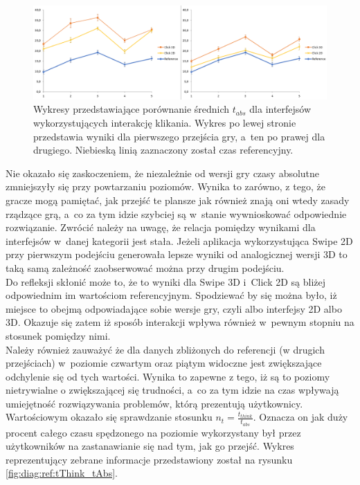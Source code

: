 \documentclass[a4paper,12pt,numbers=noenddot]{report}
\begin{document}
\begin{figure}[h!]
	\centering
  	\includegraphics[width=\linewidth]{diag/tAbs_click12.png}
	\caption{Wykresy przedstawiające porównanie średnich $t_{abs}$ dla interfejsów wykorzystujących interakcję klikania. Wykres po lewej stronie przedstawia wyniki dla pierwszego przejścia gry, a~ten po prawej dla drugiego. Niebieską linią zaznaczony został czas referencyjny.}
	\label{fig:diag:tAbs_click12}
\end{figure}

Nie okazało się zaskoczeniem, że niezależnie od wersji gry czasy absolutne zmniejszyły się przy powtarzaniu poziomów. Wynika to zarówno, z tego, że gracze mogą pamiętać, jak przejść te plansze jak również znają oni wtedy zasady rządzące grą, a~co za tym idzie szybciej są w~stanie wywnioskować odpowiednie rozwiązanie. Zwrócić należy na uwagę, że relacja pomiędzy wynikami dla interfejsów w~danej kategorii jest stała. Jeżeli aplikacja wykorzystująca Swipe 2D przy pierwszym podejściu generowała lepsze wyniki od analogicznej wersji 3D to taką samą zależność zaobserwować można przy drugim podejściu.\\
Do refleksji skłonić może to, że to wyniki dla Swipe 3D i~Click 2D są bliżej odpowiednim im wartościom referencyjnym. Spodziewać by się można było, iż miejsce to obejmą odpowiadające sobie wersje gry, czyli albo interfejsy 2D albo 3D. Okazuje się zatem iż sposób interakcji wpływa również w~pewnym stopniu na stosunek pomiędzy nimi. \\
Należy również zauważyć że dla danych zbliżonych do referencji (w drugich przejściach) w~poziomie czwartym oraz piątym widoczne jest zwiększające odchylenie się od tych wartości. Wynika to zapewne z tego, iż są to poziomy nietrywialne o zwiększającej się trudności, a~co za tym idzie na czas wpływają umiejętność rozwiązywania problemów, którą prezentują użytkownicy.\\

Wartościowym okazało się sprawdzanie stosunku $n_{t} = \frac{t_{think}}{t_{abs}}$. Oznacza on jak duży procent całego czasu spędzonego na poziomie wykorzystany był przez użytkowników na zastanawianie się nad tym, jak go przejść. Wykres reprezentujący zebrane informacje przedstawiony został na rysunku \ref{fig:diag:ref:tThink_tAbs}.
\end{document}
